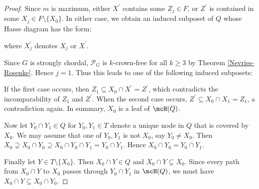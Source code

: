 \begin{proof}
Since $ m $ is maximum, either $ X^{\prime} $ contains some $ Z_{j} \in F$, or $ Z^{\prime} $ is contained in some  $ X_{j} \in F \setminus \{X_0\}$. 
In either case, we obtain an induced subposet of $Q$ whose Hasse diagram has the form: 
\begin{center}
\end{center}
where $ X_{j}^{\prime} $ denotes $ X_{j} $ or $ X^{\prime} $.

Since $ G $ is strongly chordal, $ \mathcal{P}_{G} $ is $ k $-crown-free for all $ k \geq 3 $ by Theorem \ref{Nevries-Rosenke}. 
Hence $ j = 1 $. 
Thus this leads to one of the following induced subposets: 
\begin{center}
\hspace{7mm} \hspace{7mm}
\end{center}

If the first case occurs, then $ Z_{1} \subseteq X_{0} \cap X^{\prime} = Z^{\prime} $, which contradicts the incomparability of $ Z_{1} $ and $ Z^{\prime} $. 
When the second case occurs, $ Z^{\prime} \subseteq X_{0} \cap X_{1} = Z_{1} $, a contradiction again. 
In summary, $ X_{0} $ is a leaf of $\mcH(Q)$. 

Now let $ Y_{0} \cap Y_{1} \in Q$  for $Y_{0}, Y_{1} \in T$ denote a unique node in $ Q $ that is covered by~$ X_{0} $. 
We may assume that one of $Y_{0}, Y_{1}$ is not $X_0$, say $ Y_{0} \neq X_{0} $.
Then $ X_{0} \supsetneq X_{0} \cap Y_{0} \supseteq X_{0} \cap Y_{0} \cap Y_{1} = Y_{0} \cap Y_{1} $. 
Hence $ X_{0} \cap Y_{0} = Y_{0} \cap Y_{1} $. 

Finally let $ Y \in T\setminus\{X_{0}\} $. 
Then $ X_{0} \cap Y \in Q $ and $ X_{0} \cap Y \subsetneq X_{0} $. 
Since every path from $ X_{0} \cap Y $ to $ X_{0} $ passes through $   Y_{0} \cap Y_{1} $ in $\mcH(Q)$, we must have $ X_{0} \cap Y \subseteq X_{0} \cap Y_{0} $. 
\end{proof}



